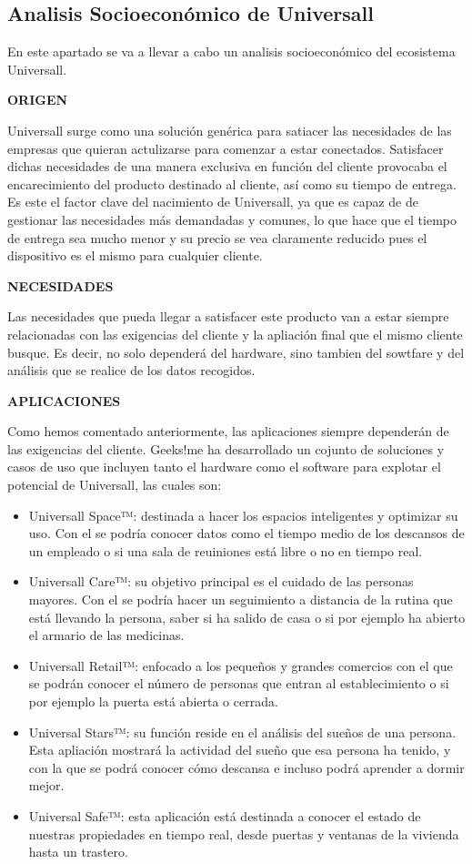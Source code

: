 \subsection{Analisis Socioeconómico de Universall}

En este apartado se va a llevar  a cabo un analisis socioeconómico del ecosistema  Universall.

\textbf{ORIGEN}

Universall surge como una solución genérica para satiacer las necesidades de las empresas que quieran actulizarse para comenzar a estar conectados. Satisfacer dichas necesidades de una manera exclusiva en función del cliente provocaba el encarecimiento del producto destinado al cliente, así como su tiempo de entrega. Es este el factor clave del nacimiento de Universall, ya que es capaz de de gestionar las necesidades más demandadas y comunes, lo que hace que el tiempo de entrega sea mucho menor y su precio se vea claramente reducido pues el dispositivo es el mismo para cualquier cliente. 

\textbf{NECESIDADES}

Las necesidades que pueda llegar a satisfacer este producto van a estar siempre relacionadas con las exigencias del cliente y la apliación final que el mismo cliente busque. Es decir, no solo dependerá del hardware, sino tambien del sowtfare y del análisis que se realice de los datos recogidos. 

\textbf{APLICACIONES}

Como hemos comentado anteriormente, las aplicaciones siempre dependerán de las exigencias del cliente. Geeks!me ha desarrollado un cojunto de soluciones y casos de uso que incluyen tanto el hardware como el software para explotar el potencial de Universall, las cuales son:

\begin{itemize}
\item Universall Space™: destinada a hacer los espacios inteligentes y optimizar su uso. Con el se podría conocer datos como el tiempo medio de los descansos de un empleado o si una sala de reuiniones está libre o no en tiempo real.
\item Universall Care™: su objetivo principal es el cuidado de las personas mayores. Con el se podría hacer un seguimiento a distancia de la rutina que está llevando la persona, saber si ha salido de casa o si por ejemplo ha abierto el armario de las medicinas.
\item Universall Retail™: enfocado a los pequeños y grandes comercios con el que se podrán conocer el número de personas que entran al establecimiento o si por ejemplo la puerta está abierta o cerrada.
\item Universal Stars™: su función reside en el análisis del sueños de una persona. Esta apliación mostrará la actividad del sueño que esa persona ha tenido, y con la que se podrá conocer cómo descansa e incluso podrá aprender a dormir mejor.
\item Universal Safe™: esta aplicación está destinada a conocer el estado de nuestras propiedades en tiempo real, desde puertas y ventanas de la vivienda hasta un trastero.
\end{itemize}


